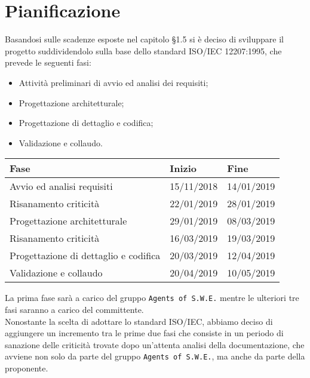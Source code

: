 \section{Pianificazione}

Basandosi sulle scadenze esposte nel capitolo §1.5 si è deciso di sviluppare il progetto suddividendolo sulla base dello standard ISO/IEC 12207:1995, che prevede le seguenti fasi:
\begin{itemize}
	\item Attività preliminari di avvio ed analisi dei requisiti;
	\item Progettazione architetturale;
	\item Progettazione di dettaglio e codifica;
	\item Validazione e collaudo.
\end{itemize}

\begin{longtable}{ m{8cm} m{3cm} p{3cm} }
\hline

\rowcolor{bluelogo}\color{white}\textbf{Fase} & \color{white}\textbf{Inizio} & \color{white}\textbf{Fine} \\
\hline
\rowcolor{beigechiaro} \color{black} Avvio ed analisi requisiti & 15/11/2018 & 14/01/2019 \\
\rowcolor{beigescuro} \color{black} Risanamento criticità & 22/01/2019 & 28/01/2019 \\
\rowcolor{beigechiaro} \color{black} Progettazione architetturale & 29/01/2019 & 08/03/2019 \\
\rowcolor{beigescuro} \color{black} Risanamento criticità & 16/03/2019 & 19/03/2019 \\
\rowcolor{beigechiaro} \color{black} Progettazione di dettaglio e codifica & 20/03/2019 & 12/04/2019 \\
\rowcolor{beigescuro} \color{black} Validazione e collaudo & 20/04/2019 & 10/05/2019 \\

\hline
\end{longtable}

La prima fase sarà a carico del gruppo \texttt{Agents of S.W.E.} mentre le ulteriori tre fasi saranno a carico del committente. \\
Nonostante la scelta di adottare lo standard ISO/IEC, abbiamo deciso di aggiungere un incremento tra le prime due fasi che consiste in un periodo di sanazione delle criticità trovate dopo un'attenta analisi della documentazione, che avviene non solo da parte del gruppo \texttt{Agents of S.W.E.}, ma anche da parte della proponente. 

